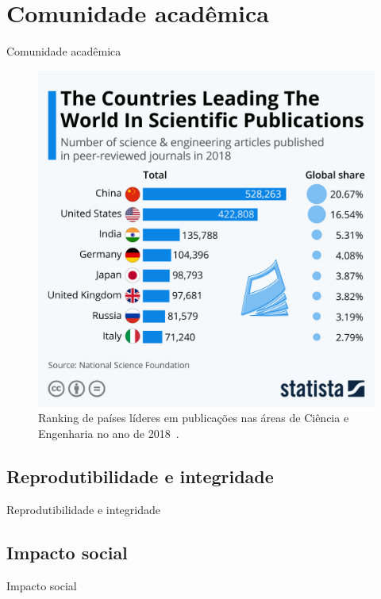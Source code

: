 \section{Comunidade acadêmica}
\label{s.community}

\begin{frame}{Comunidade acadêmica}
	\centering
	\begin{figure}
		\includegraphics[scale=0.125]{figs/lead_country_papers.png}
		\caption{Ranking de países líderes em publicações nas áreas de Ciência e Engenharia no ano de 2018~\cite{Statista:18}.}
		\label{f.lead_country_papers}
	\end{figure}
\end{frame}

\subsection{Reprodutibilidade e integridade}
\label{ss.reproducibility_integrity}

\begin{frame}{Reprodutibilidade e integridade}
\end{frame}

\subsection{Impacto social}
\label{ss.social_impact}

\begin{frame}{Impacto social}
\end{frame}
